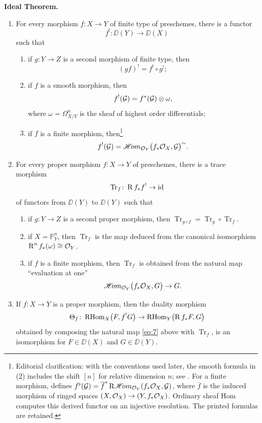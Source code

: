 \filbreak
\bigskip
\noindent
\textbf{Ideal Theorem.}
\begin{enumerate}
	\item[(a)] For every morphism $f\colon X\to Y$ of finite type of preschemes, there is a functor
	\[
	f^{!}\colon \DD(Y)\longrightarrow\DD(X)
	\]
	such that
	\begin{enumerate}
		\item[1)] if $g\colon Y\to Z$ is a second morphism of finite type, then
		\[
		(gf)^{!}=f^{!}\circ g^{!};
		\]
		\item[2)] if $f$ is a smooth morphism, then
		\[
		f^{!}(\mathcal{G})=f^{*}(\mathcal{G})\otimes\omega,
		\]
		where $\omega=\Omega_{X/Y}^{n}$ is the sheaf of highest order differentials;
		\item[3)] if $f$ is a finite morphism, then\footnote{Editorial clarification: with the conventions used later, the smooth formula in (2) includes the shift $[n]$ for relative dimension $n$; see . For a finite morphism,  defines $f^{\flat}(\mathcal{G})=\overline f^{*}\mathop{\mathrm{R}\mathscr{H}\!om}\nolimits_{\mathcal{O}_Y}(f_*\mathcal{O}_X,\mathcal{G})$, where $\overline f$ is the induced morphism of ringed spaces $(X,\mathcal{O}_X)\to(Y,f_*\mathcal{O}_X)$. Ordinary sheaf Hom computes this derived functor on an injective resolution. The printed formulas are retained.}
		\[
		f^{!}(\mathcal{G})=\mathop{\mathscr{H}\!om}\nolimits_{\mathcal{O}_{Y}}\bigl(f_{*}\mathcal{O}_{X},\mathcal{G}\bigr)^{\sim}.
		\]
	\end{enumerate}

\item[(b)] For every proper morphism $f\colon X\to Y$ of preschemes, there is a trace morphism
\[
\operatorname{Tr}_{f}\colon \operatorname{R} f_{*}f^{!}\to\operatorname{id}
\]
of functors from $\DD(Y)$ to $\DD(Y)$ such that
\begin{enumerate}
	\item[1)] if $g\colon Y\to Z$ is a second proper morphism, then $\operatorname{Tr}_{g\circ f}=\operatorname{Tr}_{g}\circ\operatorname{Tr}_{f}$.
	\item[2)] if $X=\mathbb{P}_{Y}^{n}$, then $\operatorname{Tr}_{f}$ is the map deduced from the canonical isomorphism $\operatorname{R}^{n}f_{*}(\omega)\cong\mathcal{O}_{Y}$.
	\item[3)] if $f$ is a finite morphism, then $\operatorname{Tr}_{f}$ is obtained from the natural map ``evaluation at one''
	\[
	\mathop{\mathscr{H}\!om}\nolimits_{\mathcal{O}_Y}\bigl(f_{*}\mathcal{O}_{X},G\bigr)\to G.
	\]
\end{enumerate}

\smallskip
\item[(c)] If $f\colon X\to Y$ is a proper morphism, then the duality morphism
\[
\Theta_{f}\colon \operatorname{RHom}_{X}\bigl(F,f^{!}G\bigr)\to \operatorname{RHom}_{Y}\bigl(\operatorname{R} f_{*}F,G\bigr)
\]
obtained by composing the natural map \eqref{eq:7} above with $\operatorname{Tr}_{f}$, is an isomorphism for $F\in \DD(X)$ and $G\in \DD(Y)$.

\bigskip
	
\end{enumerate}



